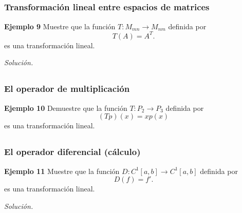 
\subsection{}

\begin{frame}\frametitle{Transformación lineal entre espacios de matrices}

\begin{ej}{\textbf{Ejemplo 9}}
	\justifying
	Muestre que la función  $T:M_{mn}\to M_{nm}$ definida por 
	\[
		T(A) = A^T.
	\]
	es una transformación lineal.
	
\end{ej}
\textit{Solución.}

\end{frame}


\subsection{}

\begin{frame}\frametitle{El operador de multiplicación}
	
	\begin{ej}{\textbf{Ejemplo 10}}
		\justifying
		Demuestre que la función  $T:P_2\to P_3$ definida por 
		\[
		(Tp)(x) = xp(x)
		\]
		es una transformación lineal.
		
	\end{ej}
	
\end{frame}


\subsection{}

\begin{frame}\frametitle{El operador diferencial (cálculo)}

\begin{ej}{\textbf{Ejemplo 11}}
	\justifying
	Muestre que la función  $D:C^1[a,b]\to C^1[a,b]$ definida por 
	\[
		D(f) = f'.
	\]
	es una transformación lineal.
	
\end{ej}
\textit{Solución.}

\end{frame}

